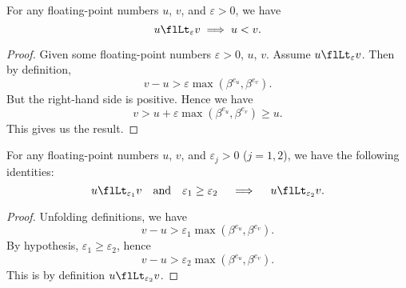 \begin{thm}
  For any floating-point numbers $u$, $v$, and $\varepsilon>0$, we have
  \begin{equation*}
    u\flLt_{\varepsilon} v\implies u < v.
  \end{equation*}
\end{thm}
\begin{proof}
  Given some floating-point numbers $\varepsilon>0$, $u$, $v$.
  Assume $u\flLt_{\varepsilon} v$.
  Then by definition,
  \begin{equation}
    v - u > \varepsilon\max(\beta^{e_{u}},\beta^{e_{v}}).
  \end{equation}
  But the right-hand side is positive. Hence we have
  \begin{equation}
    v > u + \varepsilon\max(\beta^{e_{u}},\beta^{e_{v}})\geq u.
  \end{equation}
  This gives us the result.
\end{proof}


\begin{thm}
  For any floating-point numbers $u$, $v$, and $\varepsilon_{j}>0$ ($j=1,2$),
  we have the following identities:
  \begin{equation*}
    u\flLt_{\varepsilon_{1}}v
        \quad\mbox{and}\quad
        \varepsilon_{1}\geq\varepsilon_{2}
    \quad\implies\quad
    u\flLt_{\varepsilon_{2}}v.
  \end{equation*}
\end{thm}
\begin{proof}
  Unfolding definitions, we have
  \begin{equation}
    v - u > \varepsilon_{1}\max(\beta^{e_{u}},\beta^{e_{v}}).
  \end{equation}
  By hypothesis, $\varepsilon_{1}\geq\varepsilon_{2}$, hence
  \begin{equation}
    v - u > \varepsilon_{2}\max(\beta^{e_{u}},\beta^{e_{v}}).
  \end{equation}
  This is by definition $u\flLt_{\varepsilon_{2}}v$.
\end{proof}


